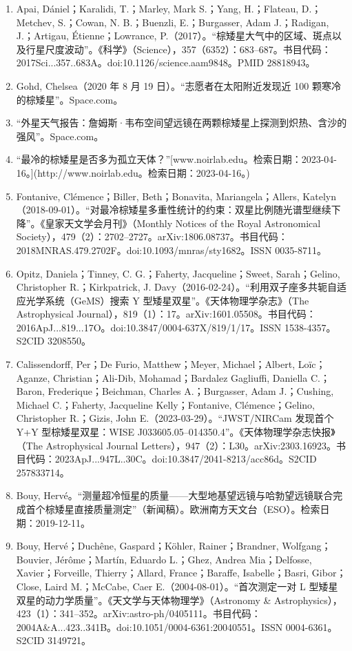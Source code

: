 \begin{enumerate}
\item Apai, Dániel；Karalidi, T.；Marley, Mark S.；Yang, H.；Flateau, D.；Metchev, S.；Cowan, N. B.；Buenzli, E.；Burgasser, Adam J.；Radigan, J.；Artigau, Étienne；Lowrance, P.（2017）。“棕矮星大气中的区域、斑点以及行星尺度波动”。《科学》（Science），357（6352）：683–687。书目代码：2017Sci...357..683A。doi:10.1126/science.aam9848。PMID 28818943。
\item Gohd, Chelsea（2020 年 8 月 19 日）。“志愿者在太阳附近发现近 100 颗寒冷的棕矮星”。Space.com。
\item “外星天气报告：詹姆斯·韦布空间望远镜在两颗棕矮星上探测到炽热、含沙的强风”。Space.com。
\item “最冷的棕矮星是否多为孤立天体？”[www.noirlab.edu。检索日期：2023-04-16。](http://www.noirlab.edu。检索日期：2023-04-16。)
\item Fontanive, Clémence；Biller, Beth；Bonavita, Mariangela；Allers, Katelyn（2018-09-01）。“对最冷棕矮星多重性统计的约束：双星比例随光谱型继续下降”。《皇家天文学会月刊》（Monthly Notices of the Royal Astronomical Society），479（2）：2702–2727。arXiv:1806.08737。书目代码：2018MNRAS.479.2702F。doi:10.1093/mnras/sty1682。ISSN 0035-8711。
\item Opitz, Daniela；Tinney, C. G.；Faherty, Jacqueline；Sweet, Sarah；Gelino, Christopher R.；Kirkpatrick, J. Davy（2016-02-24）。“利用双子座多共轭自适应光学系统（GeMS）搜索 Y 型矮星双星”。《天体物理学杂志》（The Astrophysical Journal），819（1）：17。arXiv:1601.05508。书目代码：2016ApJ...819...17O。doi:10.3847/0004-637X/819/1/17。ISSN 1538-4357。S2CID 3208550。
\item Calissendorff, Per；De Furio, Matthew；Meyer, Michael；Albert, Loïc；Aganze, Christian；Ali-Dib, Mohamad；Bardalez Gagliuffi, Daniella C.；Baron, Frederique；Beichman, Charles A.；Burgasser, Adam J.；Cushing, Michael C.；Faherty, Jacqueline Kelly；Fontanive, Clémence；Gelino, Christopher R.；Gizis, John E.（2023-03-29）。“JWST/NIRCam 发现首个 Y+Y 型棕矮星双星：WISE J033605.05–014350.4”。《天体物理学杂志快报》（The Astrophysical Journal Letters），947（2）：L30。arXiv:2303.16923。书目代码：2023ApJ...947L..30C。doi:10.3847/2041-8213/acc86d。S2CID 257833714。
\item Bouy, Hervé。“测量超冷恒星的质量——大型地基望远镜与哈勃望远镜联合完成首个棕矮星直接质量测定”（新闻稿）。欧洲南方天文台（ESO）。检索日期：2019-12-11。
\item Bouy, Hervé；Duchêne, Gaspard；Köhler, Rainer；Brandner, Wolfgang；Bouvier, Jérôme；Martín, Eduardo L.；Ghez, Andrea Mia；Delfosse, Xavier；Forveille, Thierry；Allard, France；Baraffe, Isabelle；Basri, Gibor；Close, Laird M.；McCabe, Caer E.（2004-08-01）。“首次测定一对 L 型矮星双星的动力学质量”。《天文学与天体物理学》（Astronomy & Astrophysics），423（1）：341–352。arXiv:astro-ph/0405111。书目代码：2004A&A...423..341B。doi:10.1051/0004-6361:20040551。ISSN 0004-6361。S2CID 3149721。

\end{enumerate}
